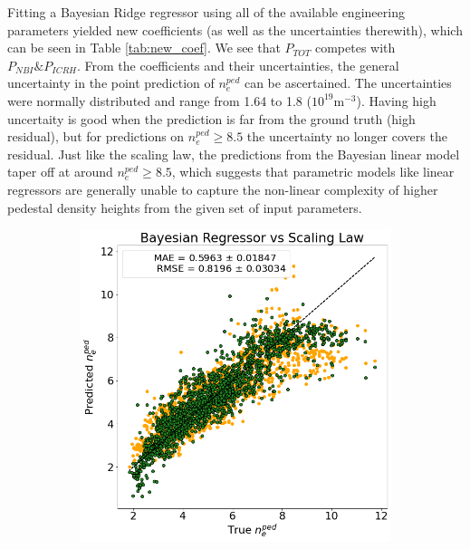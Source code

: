 \documentclass[a4paper, twoside, final, 12pt]{article}
\begin{document}
{Fitting a Bayesian Ridge regressor using all of the available engineering parameters yielded new coefficients (as well as the uncertainties therewith), which can be seen in Table \ref{tab:new_coef}. We see that $P_{TOT}$ competes with $P_{NBI} \& P_{ICRH}$.  
From the coefficients and their uncertainties, the general uncertainty in the point prediction of $n_e^{ped}$ can be ascertained. The uncertainties were normally distributed and range from 1.64 to 1.8 ($10^{19}\text{m}^{-3}$). Having high uncertaity is good when the prediction is far from the ground truth (high residual), but for predictions on $n_e^{ped} \geq 8.5$ the uncertainty no longer covers the residual. 
Just like the scaling law, the predictions from the Bayesian linear model taper off at around $n_e^{ped} \geq 8.5$, which suggests that parametric models like linear regressors are generally unable to capture the non-linear complexity of higher pedestal density heights from the given set of input parameters.
\begin{figure}[H]
	\centering
	\begin{subfigure}{0.495\linewidth}
		\centering
		\includegraphics[scale=0.35]{./src/Baysian_regression_predictions}
	\end{subfigure}
	\begin{subfigure}{0.495\linewidth}
		\centering

\end{subfigure}
\end{figure}}
\end{document}
